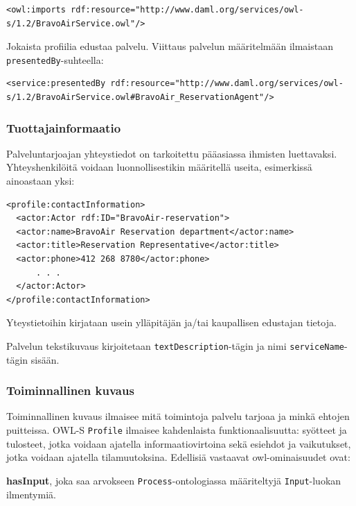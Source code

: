 \documentclass[finnish]{tktltiki2}
\theoremstyle{definition}
\theoremstyle{remark}
\begin{document}
\begin{verbatim}
<owl:imports rdf:resource="http://www.daml.org/services/owl-s/1.2/BravoAirService.owl"/>
\end{verbatim} 

Jokaista profiilia edustaa palvelu. Viittaus palvelun määritelmään ilmaistaan \texttt{presentedBy}-suhteella\cite{daml}: 

\begin{verbatim}
<service:presentedBy rdf:resource="http://www.daml.org/services/owl-s/1.2/BravoAirService.owl#BravoAir_ReservationAgent"/> 
\end{verbatim} 

\subsubsection{Tuottajainformaatio}

Palveluntarjoajan yhteystiedot on tarkoitettu pääasiassa ihmisten luettavaksi. Yhteyshenkilöitä voidaan luonnollisestikin määritellä useita, esimerkissä ainoastaan yksi\cite{daml}:  

\begin{verbatim}
<profile:contactInformation>
  <actor:Actor rdf:ID="BravoAir-reservation">
  <actor:name>BravoAir Reservation department</actor:name>
  <actor:title>Reservation Representative</actor:title>
  <actor:phone>412 268 8780</actor:phone>
      . . .
  </actor:Actor>
</profile:contactInformation>
\end{verbatim} 

Yteystietoihin kirjataan usein ylläpitäjän ja/tai kaupallisen edustajan tietoja. 

Palvelun tekstikuvaus kirjoitetaan \texttt{textDescription}-tägin ja nimi \texttt{serviceName}-tägin sisään.  


\subsubsection{Toiminnallinen kuvaus}

Toiminnallinen kuvaus ilmaisee mitä toimintoja palvelu tarjoaa ja minkä ehtojen puitteissa. OWL-S \texttt{Profile} ilmaisee kahdenlaista funktionaalisuutta: syötteet ja tulosteet, jotka voidaan ajatella informaatiovirtoina sekä esiehdot ja vaikutukset, jotka voidaan ajatella tilamuutoksina. Edellisiä vastaavat owl-ominaisuudet ovat\cite{OWLS}:

\textbf{hasInput}, joka saa arvokseen \texttt{Process}-ontologiassa määriteltyjä \texttt{Input}-luokan ilmentymiä. 
\end{document}
